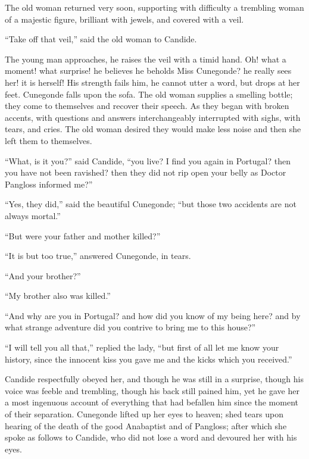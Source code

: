 The old woman returned very soon, supporting with difficulty a trembling woman of a majestic figure, brilliant with jewels, and covered with a veil.

``Take off that veil,'' said the old woman to Candide.

The young man approaches, he raises the veil with a timid hand. Oh! what a moment! what surprise! he believes he beholds Miss Cunegonde? he really sees her! it is herself! His strength fails him, he cannot utter a word, but drops at her feet. Cunegonde falls upon the sofa. The old woman supplies a smelling bottle; they come to themselves and recover their speech. As they began with broken accents, with questions and answers interchangeably interrupted with sighs, with tears, and cries. The old woman desired they would make less noise and then she left them to themselves.

``What, is it you?'' said Candide, ``you live? I find you again in Portugal? then you have not been ravished? then they did not rip open your belly as Doctor Pangloss informed me?''

``Yes, they did,'' said the beautiful Cunegonde; ``but those two accidents are not always mortal.''

``But were your father and mother killed?''

``It is but too true,'' answered Cunegonde, in tears.

``And your brother?''

``My brother also was killed.''

``And why are you in Portugal? and how did you know of my being here? and by what strange adventure did you contrive to bring me to this house?''

``I will tell you all that,'' replied the lady, ``but first of all let me know your history, since the innocent kiss you gave me and the kicks which you received.''

Candide respectfully obeyed her, and though he was still in a surprise, though his voice was feeble and trembling, though his back still pained him, yet he gave her a most ingenuous account of everything that had befallen him since the moment of their separation. Cunegonde lifted up her eyes to heaven; shed tears upon hearing of the death of the good Anabaptist and of Pangloss; after which she spoke as follows to Candide, who did not lose a word and devoured her with his eyes.

